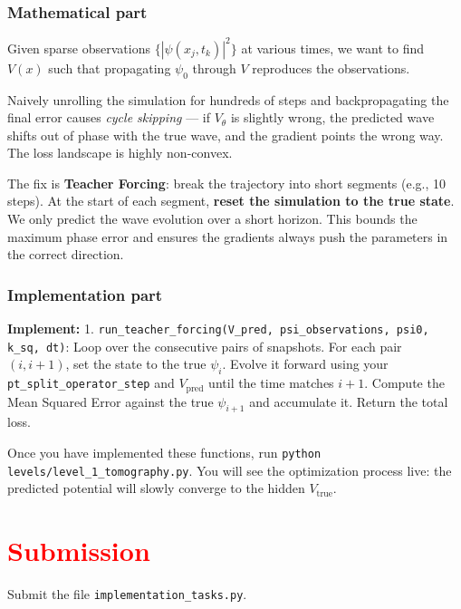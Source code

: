 \documentclass[11pt]{article}
\begin{document}
\subsubsection*{Mathematical part}
Given sparse observations $\{|\psi(x_j, t_k)|^2\}$ at various times, we want to find $V(x)$ such that propagating $\psi_0$ through $V$ reproduces the observations.

Naively unrolling the simulation for hundreds of steps and backpropagating the final error causes \emph{cycle skipping} --- if $V_\theta$ is slightly wrong, the predicted wave shifts out of phase with the true wave, and the gradient points the wrong way. The loss landscape is highly non-convex.

The fix is \textbf{Teacher Forcing}: break the trajectory into short segments (e.g., 10 steps). At the start of each segment, \textbf{reset the simulation to the true state}. We only predict the wave evolution over a short horizon. This bounds the maximum phase error and ensures the gradients always push the parameters in the correct direction.

\subsubsection*{Implementation part}
\textbf{Implement:}
1. \lstinline|run_teacher_forcing(V_pred, psi_observations, psi0, k_sq, dt)|: Loop over the consecutive pairs of snapshots. For each pair $(i, i+1)$, set the state to the true $\psi_i$. Evolve it forward using your \lstinline|pt_split_operator_step| and $V_{\text{pred}}$ until the time matches $i+1$. Compute the Mean Squared Error against the true $\psi_{i+1}$ and accumulate it. Return the total loss.

Once you have implemented these functions, run \lstinline|python levels/level_1_tomography.py|. You will see the optimization process live: the predicted potential will slowly converge to the hidden $V_{\text{true}}$.

\section*{\textcolor{red}{Submission}}

Submit the file \texttt{implementation\_tasks.py}.
\end{document}
